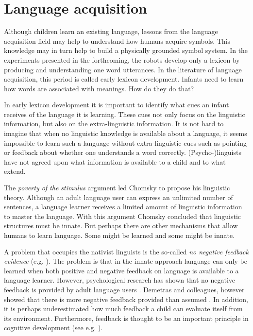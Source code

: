 
\section{Language acquisition}\label{s:intro:acquisition}

Although children learn an existing language, lessons from the language acquisition field may help to understand how humans acquire symbols. This knowledge may in turn help to build a physically grounded symbol system. In the experiments presented in the forthcoming, the robots develop only a lexicon by producing and understanding one word utterances. In the literature of language acquisition, this period is called {\sc early lexicon development}. Infants need to learn how words are associated with meanings. How do they do that?

In early lexicon development it is important to identify what cues an infant receives of the language it is learning. These cues not only focus on the linguistic information, but also on the extra-linguistic information. It is not hard to imagine that when no linguistic knowledge is available about a language, it seems impossible to learn such a language without extra-linguistic cues such as pointing or feedback about whether one understands a word correctly. (Psycho-)\allowbreak linguists have not agreed upon what information is available to a child and to what extend.

The {\em poverty of the stimulus} argument led Chomsky to propose his linguistic theory. Although an adult language user can express an unlimited number of sentences, a language learner receives a limited amount of linguistic information to master the language. With this argument Chomsky concluded that linguistic structures must be innate. But perhaps there are other mechanisms that allow humans to learn language. Some might be learned and some might be innate.


A problem that occupies the nativist linguists is the so-called {\em no negative feedback evidence} (e.g. \citealt{bowerman:1988}). The problem is that in the innate approach language can only be learned when both positive and negative feedback on language is available to a language learner. However, psychological research has shown that no negative feedback is provided by adult language users \citep{braine:1971}. Demetras and colleagues, however showed that there is more negative feedback provided than assumed \citep{demetrasetal:1986}. In addition, it is perhaps underestimated how much feedback a child can evaluate itself from its environment. Furthermore, feedback is thought to be an important principle in cognitive development (see e.g. \citealt{clancey:1997}).

